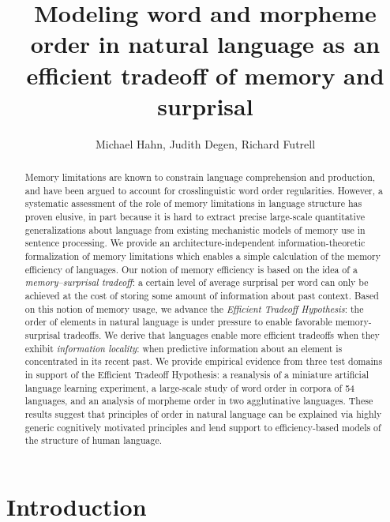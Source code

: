 \documentclass[11pt,letterpaper]{article}
\title{Modeling word and morpheme order in natural language as an efficient tradeoff of memory and surprisal}
\author{Michael Hahn, Judith Degen, Richard Futrell}
\newcommand{\jd}[1]{\textcolor{Purple}{[jd: #1]}}
\begin{document}
\maketitle


\begin{abstract}
Memory limitations are known to constrain language comprehension and production, and have been argued to account for crosslinguistic word order regularities.
However, a systematic assessment of the role of memory limitations in language structure has proven elusive, in part because it is hard to extract precise large-scale quantitative generalizations about language from existing mechanistic models of memory use in sentence processing.
We provide an architecture-independent information-theoretic formalization of memory limitations which enables a simple calculation of the memory efficiency of languages.
Our notion of memory efficiency is based on the idea of a \emph{memory--surprisal tradeoff}: a certain level of average surprisal per word can only be achieved at the cost of storing some amount of information about past context.
Based on this notion of memory usage, we advance the \emph{Efficient Tradeoff Hypothesis}: the order of elements in natural language is under pressure to enable favorable memory-surprisal tradeoffs.
We derive that languages enable more efficient tradeoffs when they exhibit \emph{information locality}: when predictive information about an element is concentrated in its recent past.
We provide empirical evidence from three test domains in support of the Efficient Tradeoff Hypothesis:
a reanalysis of a miniature artificial language learning experiment, a large-scale study of word order in corpora of 54 languages, and an analysis of morpheme order in two agglutinative languages. These results suggest that principles of order in natural language can be explained via highly generic cognitively motivated principles and lend support to efficiency-based models of the structure of human language.
\end{abstract}

 
\section{Introduction}

\end{document}
